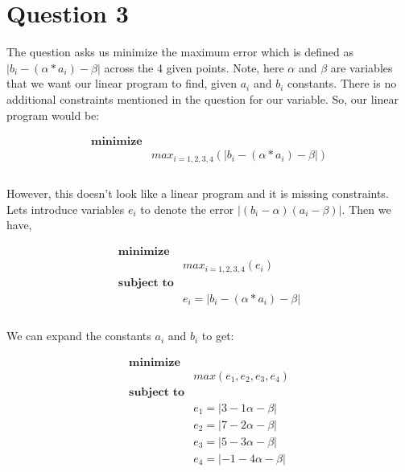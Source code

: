 \documentclass{article}
\begin{document}
    \section*{Question 3}

    The question asks us minimize the maximum error which is defined as $|b_i - (\alpha * a_i) - \beta|$ across the 4 given points. Note, here $\alpha$ and $\beta$ are variables that we want our linear program to find, given $a_i$ and $b_i$ constants. There is no additional constraints mentioned in the question for our variable. So, our linear program would be:

    \begin{equation*}
        \begin{aligned}
            \textbf{minimize} \\
            & max_{i=1,2,3,4}( |b_i - (\alpha * a_i) - \beta| ) \\
        \end{aligned}
    \end{equation*} \\

    However, this doesn't look like a linear program and it is missing constraints. Lets introduce variables $e_i$ to denote the error $|(b_i - \alpha)(a_i - \beta)|$. Then we have,

    \begin{equation*}
        \begin{aligned}
            \textbf{minimize} \\
            & max_{i=1,2,3,4}(e_i) \\
            \textbf{subject to} \\
            & e_i = |b_i - (\alpha * a_i) - \beta| \\
        \end{aligned}
    \end{equation*} \\

    We can expand the constants $a_i$ and $b_i$ to get:

    \begin{equation*}
        \begin{aligned}
            \textbf{minimize} \\
            & max(e_1, e_2, e_3, e_4) \\
            \textbf{subject to} \\
            & e_1 = |3 - 1\alpha - \beta| \\
            & e_2 = |7 - 2\alpha - \beta| \\
            & e_3 = |5 - 3\alpha - \beta| \\
            & e_4 = |-1 - 4\alpha - \beta| \\
        \end{aligned}
    \end{equation*} \\
\end{document}
